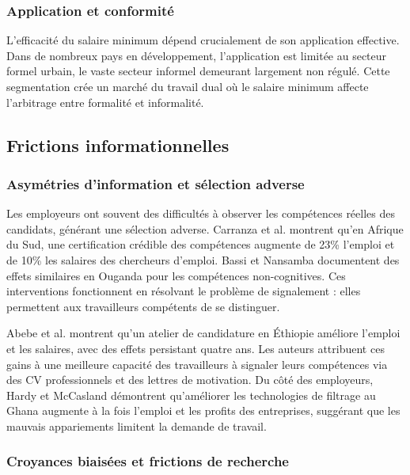 \documentclass[12pt,a4paper]{article}
\begin{document}
\subsubsection{Application et conformité}

L'efficacité du salaire minimum dépend crucialement de son application effective. Dans de nombreux pays en développement, l'application est limitée au secteur formel urbain, le vaste secteur informel demeurant largement non régulé. Cette segmentation crée un marché du travail dual où le salaire minimum affecte l'arbitrage entre formalité et informalité.

\subsection{Frictions informationnelles}

\subsubsection{Asymétries d'information et sélection adverse}

Les employeurs ont souvent des difficultés à observer les compétences réelles des candidats, générant une sélection adverse. Carranza et al. \citeyearpar{carranza2022} montrent qu'en Afrique du Sud, une certification crédible des compétences augmente de 23\% l'emploi et de 10\% les salaires des chercheurs d'emploi. Bassi et Nansamba \citeyearpar{bassi2022} documentent des effets similaires en Ouganda pour les compétences non-cognitives. Ces interventions fonctionnent en résolvant le problème de signalement : elles permettent aux travailleurs compétents de se distinguer.

Abebe et al. \citeyearpar{abebe2021} montrent qu'un atelier de candidature en Éthiopie améliore l'emploi et les salaires, avec des effets persistant quatre ans. Les auteurs attribuent ces gains à une meilleure capacité des travailleurs à signaler leurs compétences via des CV professionnels et des lettres de motivation. Du côté des employeurs, Hardy et McCasland \citeyearpar{hardy2023} démontrent qu'améliorer les technologies de filtrage au Ghana augmente à la fois l'emploi et les profits des entreprises, suggérant que les mauvais appariements limitent la demande de travail.

\subsubsection{Croyances biaisées et frictions de recherche}
\end{document}
